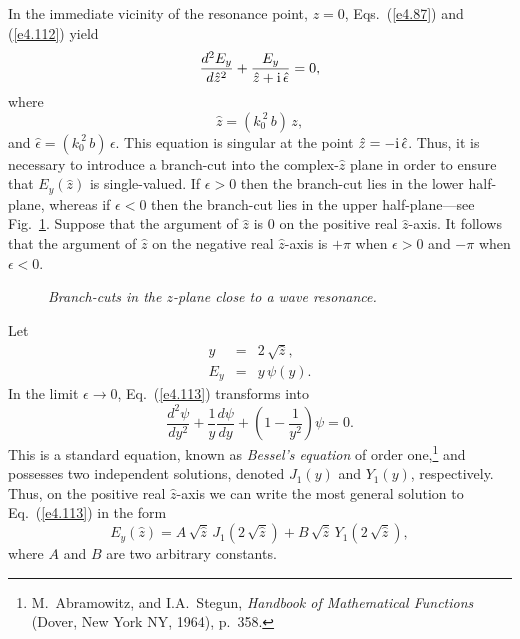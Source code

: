 In the immediate vicinity of the resonance point, $z=0$, Eqs.~(\ref{e4.87}) and (\ref{e4.112})
yield
\begin{equation}\label{e4.113}
\frac{d^2 E_y}{d\hat{z}^2} + \frac{E_y}{\hat{z}+{\rm i}\,\hat{\epsilon}} = 0,
\end{equation}
where
\begin{equation}
\hat{z} = (k_0^{~2}\,b)\,z,
\end{equation}
and $\hat{\epsilon} = (k_0^{~2}\,b)\,\epsilon$. This equation is
singular at the point $\hat{z} = -{\rm i}\,\hat{\epsilon}$. 
Thus, it is necessary to
introduce a branch-cut into the complex-$\hat{z}$ plane in order to
ensure that $E_y(\hat{z})$ is single-valued. If $\epsilon>0$ then the
branch-cut lies in the lower half-plane, whereas if $\epsilon<0$ then
the branch-cut lies in the upper half-plane---see Fig.~\ref{f17}. Suppose that the
argument of $\hat{z}$ is $0$ on the positive real $\hat{z}$-axis.
It follows that the argument of $\hat{z}$ on the negative real $\hat{z}$-axis
is $+\pi$ when $\epsilon>0$ and $-\pi$ when $\epsilon<0$. 

\begin{figure}
\epsfysize=3.5in
\centerline{}
\caption{\em Branch-cuts in the $z$-plane close to a wave resonance.}\label{f17}
\end{figure}

Let 
\begin{eqnarray}
y &=& 2\,\sqrt{\hat{z}},\\[0.5ex]
E_y &=& y\,\psi(y).
\end{eqnarray}
In the limit $\epsilon\rightarrow 0$, Eq.~(\ref{e4.113}) transforms into
\begin{equation}
\frac{d^2\psi}{dy^2} + \frac{1}{y}\frac{d\psi}{dy} + \left(1-\frac{1}{y^2}\right)\!
\psi = 0.
\end{equation}
This is a standard equation, known as {\em Bessel's equation}\/ of order one,\footnote{M.~Abramowitz, and I.A.~Stegun, {\em Handbook of Mathematical Functions}
(Dover, New York NY, 1964), p.~358.}
and possesses two independent solutions, denoted $J_1(y)$ and $Y_1(y)$,
respectively. Thus, on the positive real $\hat{z}$-axis we can write
the most general solution to Eq.~(\ref{e4.113}) in the form
\begin{equation}\label{e4.117}
E_y(\hat{z}) = A\,\sqrt{\hat{z}}\,J_1(2\,\sqrt{\hat{z}}) + 
B\,\sqrt{\hat{z}}\,Y_1(2\,\sqrt{\hat{z}}),
\end{equation}
where $A$ and $B$ are two arbitrary constants. 

